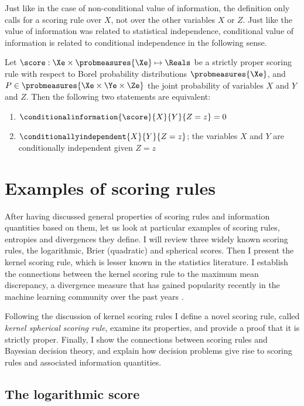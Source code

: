 Just like in the case of non-conditional value of information, the definition only calls for a scoring rule over $X$, not over the other variables $X$ or $Z$. Just like the value of information was related to statistical independence, conditional value of information is related to conditional independence in the following sense.

\begin{statement}
	Let $\score:\Xe\times\probmeasures{\Xe}\mapsto\Reals$ be a strictly proper scoring rule with respect to Borel probability distributions $\probmeasures{\Xe}$, and $P\in\probmeasures{\Xe\times\Ye\times\Ze}$ the joint probability of variables $X$ and $Y$ and $Z$. Then the following two statements are equivalent:
	\begin{enumerate}
		\item $\conditionalinformation{\score}{X}{Y}{Z=z} = 0$
		\item $\conditionallyindependent{X}{Y}{Z=z}$; the variables $X$ and $Y$ are conditionally independent given $Z=z$
	\end{enumerate}
\end{statement}


\section{Examples of scoring rules}

After having discussed general properties of scoring rules and information quantities based on them, let us look at particular examples of scoring rules, entropies and divergences they define. I will review three widely known scoring rules, the logarithmic, Brier (quadratic) and spherical scores. Then I present the kernel scoring rule, which is lesser known in the statistics literature. I establish the connections between the kernel scoring rule to the maximum mean discrepancy, a divergence measure that has gained popularity recently in the machine learning community over the past years \citep{Gretton2012,Sriperumbudur2008}.

Following the discussion of kernel scoring rules I define a novel scoring rule, called \emph{kernel spherical scoring rule}, examine its properties, and provide a proof that it is strictly proper. Finally, I show the connections between scoring rules and Bayesian decision theory, and explain how decision problems give rise to scoring rules and associated information quantities.

\subsection{The logarithmic score\label{sec:log_score}}


